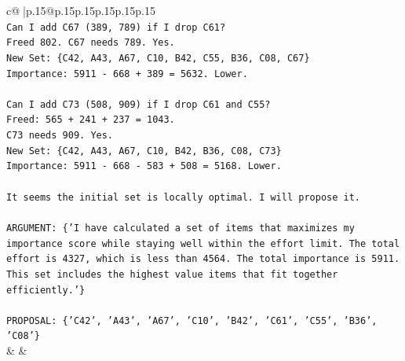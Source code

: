 \documentclass{article}
\begin{document}
{\begin{supertabular}{c@{$\;$}|p{.15\linewidth}@{}p{.15\linewidth}p{.15\linewidth}p{.15\linewidth}p{.15\linewidth}p{.15\linewidth}}
{{{\\ 
\texttt{Can I add C67 (389, 789) if I drop C61?} \\
\texttt{Freed 802. C67 needs 789. Yes.} \\
\texttt{New Set: \{C42, A43, A67, C10, B42, C55, B36, C08, C67\}} \\
\texttt{Importance: 5911 {-} 668 + 389 = 5632. Lower.} \\
\\ 
\texttt{Can I add C73 (508, 909) if I drop C61 and C55?} \\
\texttt{Freed: 565 + 241 + 237 = 1043.} \\
\texttt{C73 needs 909. Yes.} \\
\texttt{New Set: \{C42, A43, A67, C10, B42, B36, C08, C73\}} \\
\texttt{Importance: 5911 {-} 668 {-} 583 + 508 = 5168. Lower.} \\
\\ 
\texttt{It seems the initial set is locally optimal. I will propose it.} \\
\\ 
\texttt{ARGUMENT: \{'I have calculated a set of items that maximizes my importance score while staying well within the effort limit. The total effort is 4327, which is less than 4564. The total importance is 5911. This set includes the highest value items that fit together efficiently.'\}} \\
\\ 
\texttt{PROPOSAL: \{'C42', 'A43', 'A67', 'C10', 'B42', 'C61', 'C55', 'B36', 'C08'\}} \\
            }
        }
    }
    & & \\ \\


\end{supertabular}}
\end{document}
